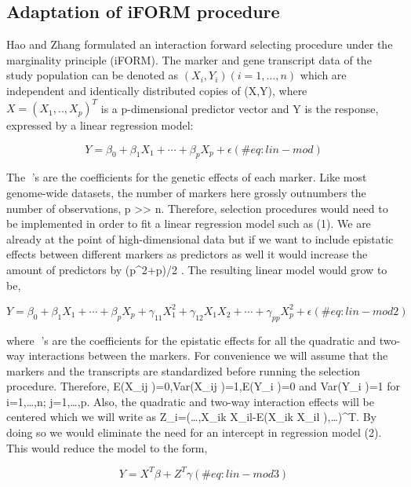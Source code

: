 \documentclass[11pt,]{book}
\theoremstyle{definition}
\theoremstyle{definition}
\theoremstyle{remark}
\begin{document}
\subsection{Adaptation of iFORM
procedure}\label{adaptation-of-iform-procedure}

Hao and Zhang \cite{hao2014interaction} formulated an interaction
forward selecting procedure under the marginality principle (iFORM). The
marker and gene transcript data of the study population can be denoted
as \((X_i,Y_i) (i = 1, …, n)\) which are independent and identically
distributed copies of (X,Y), where \(X = (X_1,..,X_p )^T\) is a
p-dimensional predictor vector and Y is the response, expressed by a
linear regression model:

\begin{equation}
Y = \beta_0 + \beta_1 X_1 + ⋯ + \beta_p X_p + \epsilon
(\#eq: lin-mod)
\end{equation}

The 's are the coefficients for the genetic effects of each marker.
Like most genome-wide datasets, the number of markers here grossly
outnumbers the number of observations, p \textgreater{}\textgreater{} n.
Therefore, selection procedures would need to be implemented in order to
fit a linear regression model such as (1). We are already at the point
of high-dimensional data but if we want to include epistatic effects
between different markers as predictors as well it would increase the
amount of predictors by (p\^{}2+p)/2 . The resulting linear model would
grow to be,

\begin{equation}
Y = \beta_0 + \beta_1 X_1 + ⋯ + \beta_p X_p + \gamma_{11} X_1^2 +\gamma_{12} {X_1}{X_2} + ⋯ + \gamma_{pp} X_p^2 + \epsilon
(\#eq: lin-mod2)
\end{equation}

where 's are the coefficients for the epistatic effects for all the
quadratic and two-way interactions between the markers. For convenience
we will assume that the markers and the transcripts are standardized
before running the selection procedure. Therefore, E(X\_ij )=0,Var(X\_ij
)=1,E(Y\_i )=0 and Var(Y\_i )=1 for i=1,\ldots{},n; j=1,\ldots{},p.
Also, the quadratic and two-way interaction effects will be centered
which we will write as Z\_i=(\ldots{},X\_ik X\_il-E(X\_ik X\_il
),\ldots{})\^{}T. By doing so we would eliminate the need for an
intercept in regression model (2). This would reduce the model to the
form,

\begin{equation}
Y = X^T \beta + Z^T \gamma
(\#eq: lin-mod3)
\end{equation}
\end{document}
